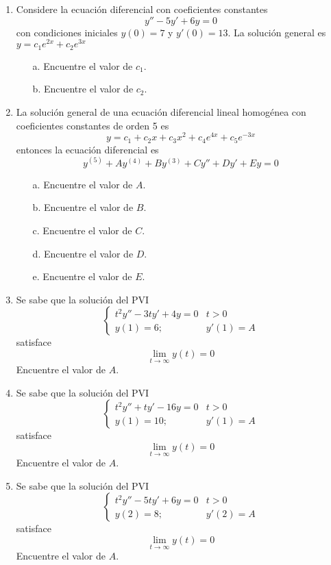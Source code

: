 \begin{enumerate}
\item Considere la ecuación diferencial con coeficientes constantes
$$y'' - 5y' + 6y = 0$$
con condiciones iniciales $y(0) = 7$ y $y'(0) = 13$.
La solución general es $y = c_1e^{2x} + c_2e^{3x}$

\begin{itemize}
    \item[a.] Encuentre el valor de $c_1$.
    \item[b.] Encuentre el valor de $c_2$.
\end{itemize}

\item La solución general de una ecuación diferencial lineal homogénea con coeficientes constantes de orden 5 es
$$y = c_1 + c_2x + c_3x^2 + c_4e^{4x} + c_5e^{-3x}$$
entonces la ecuación diferencial es
$$y^{(5)} + Ay^{(4)} + By^{(3)} + Cy'' + Dy' + Ey = 0$$

\begin{itemize}
    \item[a.] Encuentre el valor de $A$.
    \item[b.] Encuentre el valor de $B$.
    \item[c.] Encuentre el valor de $C$.
    \item[d.] Encuentre el valor de $D$.
    \item[e.] Encuentre el valor de $E$.
\end{itemize}

\item Se sabe que la solución del PVI
$$\begin{cases}
    t^2y'' - 3ty' + 4y = 0 & t > 0 \\
    y(1) = 6; & y'(1) = A
\end{cases}$$
satisface $$\lim_{t \to \infty} y(t) = 0$$
Encuentre el valor de $A$.

\item  Se sabe que la solución del PVI
$$\begin{cases}
    t^2y'' + ty' - 16y = 0 & t > 0 \\
    y(1) = 10; & y'(1) = A
\end{cases}$$
satisface $$\lim_{t \to \infty} y(t) = 0$$
Encuentre el valor de $A$.

\item Se sabe que la solución del PVI
$$\begin{cases}
    t^2y'' - 5ty' + 6y = 0 & t > 0 \\
    y(2) = 8; & y'(2) = A
\end{cases}$$
satisface $$\lim_{t \to \infty} y(t) = 0$$
Encuentre el valor de $A$.


\end{enumerate}
